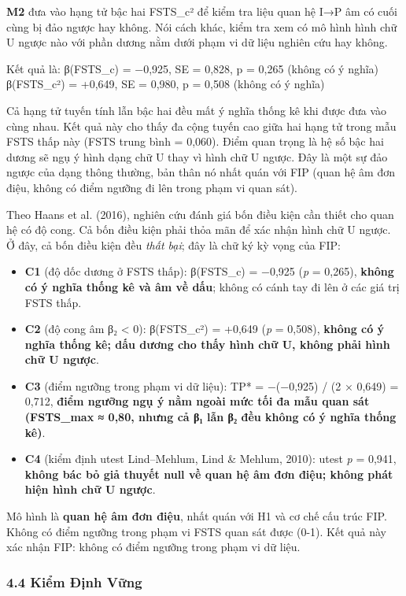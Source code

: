 \documentclass[12pt,a4paper]{article}
\providecommand{\tightlist}{\setlength{\itemsep}{0pt}\setlength{\parskip}{0pt}}
\begin{document}
\textbf{M2} đưa vào hạng tử bậc hai FSTS\_c² để kiểm tra liệu quan hệ
I→P âm có cuối cùng bị đảo ngược hay không. Nói cách khác, kiểm tra xem
có mô hình hình chữ U ngược nào với phần dương nằm dưới phạm vi dữ liệu
nghiên cứu hay không.

Kết quả là: β(FSTS\_c) = −0,925, SE = 0,828, p = 0,265 (không có ý
nghĩa) β(FSTS\_c²) = +0,649, SE = 0,980, p = 0,508 (không có ý nghĩa)

Cả hạng tử tuyến tính lẫn bậc hai đều mất ý nghĩa thống kê khi được đưa
vào cùng nhau. Kết quả này cho thấy đa cộng tuyến cao giữa hai hạng tử
trong mẫu FSTS thấp này (FSTS trung bình = 0,060). Điểm quan trọng là hệ
số bậc hai dương sẽ ngụ ý hình dạng chữ U thay vì hình chữ U ngược. Đây
là một sự đảo ngược của dạng thông thường, bản thân nó nhất quán với FIP
(quan hệ âm đơn điệu, không có điểm ngưỡng đi lên trong phạm vi quan
sát).

Theo Haans et al. (2016), nghiên cứu đánh giá bốn điều kiện cần thiết
cho quan hệ có độ cong. Cả bốn điều kiện phải thỏa mãn để xác nhận hình
chữ U ngược. Ở đây, cả bốn điều kiện đều \emph{thất bại}; đây là chữ ký
kỳ vọng của FIP:

\begin{itemize}
\tightlist
\item
  \textbf{C1} (độ dốc dương ở FSTS thấp): β(FSTS\_c) = −0,925 (\emph{p}
  = 0,265), \textbf{không có ý nghĩa thống kê và âm về dấu}; không có
  cánh tay đi lên ở các giá trị FSTS thấp.
\item
  \textbf{C2} (độ cong âm β₂ \textless{} 0): β(FSTS\_c²) = +0,649
  (\emph{p} = 0,508), \textbf{không có ý nghĩa thống kê; dấu dương cho
  thấy hình chữ U, không phải hình chữ U ngược}.
\item
  \textbf{C3} (điểm ngưỡng trong phạm vi dữ liệu): TP* = −(−0,925) / (2
  × 0,649) = 0,712, \textbf{điểm ngưỡng ngụ ý nằm ngoài mức tối đa mẫu
  quan sát (FSTS\_max ≈ 0,80, nhưng cả β₁ lẫn β₂ đều không có ý nghĩa
  thống kê)}.
\item
  \textbf{C4} (kiểm định utest Lind--Mehlum, Lind \& Mehlum, 2010):
  utest \emph{p} = 0,941, \textbf{không bác bỏ giả thuyết null về quan
  hệ âm đơn điệu; không phát hiện hình chữ U ngược}.
\end{itemize}

Mô hình là \textbf{quan hệ âm đơn điệu}, nhất quán với H1 và cơ chế cấu
trúc FIP. Không có điểm ngưỡng trong phạm vi FSTS quan sát được (0-1).
Kết quả này xác nhận FIP: không có điểm ngưỡng trong phạm vi dữ liệu.

\hypertarget{44-kiux1ec3m-ux111ux1ecbnh-vux1eefng}{%
\subsubsection{4.4 Kiểm Định
Vững}\label{44-kiux1ec3m-ux111ux1ecbnh-vux1eefng}}
\end{document}
